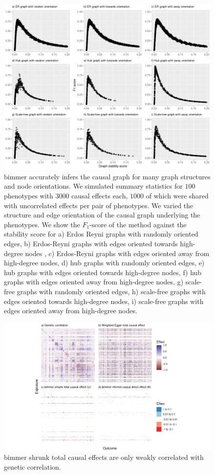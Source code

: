 \documentclass{article}
\begin{document}
\newpage
\begin{figure}[H]\label{figureS3}
\includegraphics[width=\textwidth]{figures/figure_S3.png}
\caption{bimmer accurately infers the causal graph for many graph structures and node
orientations. We simulated summary statistics for $100$ phenotypes with $3000$ causal
effects each, $1000$ of which were shared with uncorrelated effects per pair of phenotypes.
We varied the structure and edge orientation of the causal graph underlying the phenotypes.
We show the $F_1$-score of the method against the stability score for a) Erdos Reyni graphs
with randomly oriented edges, b) Erdos-Reyni graphs with edges oriented towards high-degree nodes
, c) Erdos-Reyni graphs with edges oriented away from high-degree nodes, d)
hub graphs with randomly oriented edges, e) hub graphs with edges oriented towards high-degree
 nodes, f) hub graphs with edges oriented away from high-degree nodes, g)
scale-free graphs with randomly oriented edges, h) scale-free graphs with edges oriented towards
 high-degree  nodes, i) scale-free graphs with edges oriented away from high-degree nodes. }
\end{figure}

\newpage
\begin{figure}[H]\label{figureS5}
\includegraphics[width=\textwidth]{figures/figure_S5.png}

\caption{bimmer shrunk total causal effects are only weakly correlated with genetic correlation.}
\end{figure}
\end{document}
